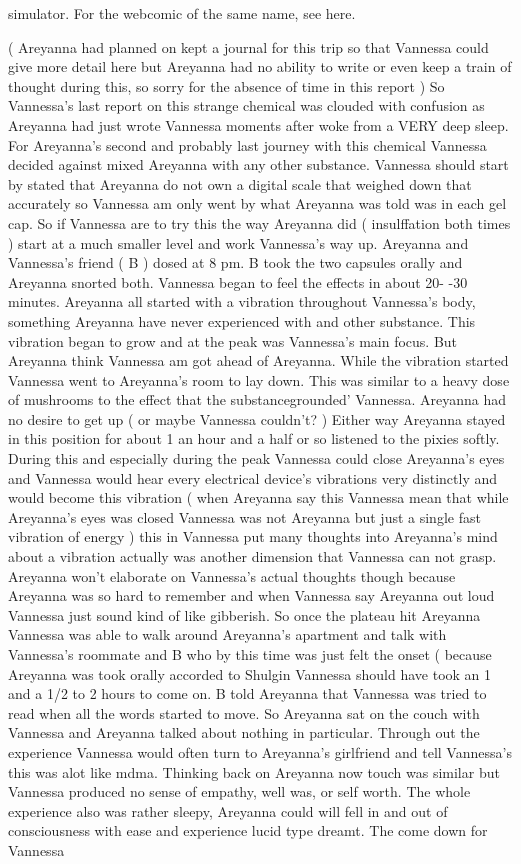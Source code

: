 \documentclass[12pt]{book}
\begin{document}
simulator. For the webcomic of the same name, see here.



( Areyanna had planned on kept a journal for this trip so that Vannessa could give more detail here but Areyanna had no ability to write or even keep a train of thought during this, so sorry for the absence of time in this report ) So Vannessa's last report on this strange chemical was clouded with confusion as Areyanna had just wrote Vannessa moments after woke from a VERY deep sleep. For Areyanna's second and probably last journey with this chemical Vannessa decided against mixed Areyanna with any other substance. Vannessa should start by stated that Areyanna do not own a digital scale that weighed down that accurately so Vannessa am only went by what Areyanna was told was in each gel cap. So if Vannessa are to try this the way Areyanna did ( insulffation both times ) start at a much smaller level and work Vannessa's way up. Areyanna and Vannessa's friend ( B ) dosed at 8 pm. B took the two capsules orally and Areyanna snorted both. Vannessa began to feel the effects in about 20- -30 minutes. Areyanna all started with a vibration throughout Vannessa's body, something Areyanna have never experienced with and other substance. This vibration began to grow and at the peak was Vannessa's main focus. But Areyanna think Vannessa am got ahead of Areyanna. While the vibration started Vannessa went to Areyanna's room to lay down. This was similar to a heavy dose of mushrooms to the effect that the substancegrounded' Vannessa. Areyanna had no desire to get up ( or maybe Vannessa couldn't? ) Either way Areyanna stayed in this position for about 1 an hour and a half or so listened to the pixies softly. During this and especially during the peak Vannessa could close Areyanna's eyes and Vannessa would hear every electrical device's vibrations very distinctly and would become this vibration ( when Areyanna say this Vannessa mean that while Areyanna's eyes was closed Vannessa was not Areyanna but just a single fast vibration of energy ) this in Vannessa put many thoughts into Areyanna's mind about a vibration actually was another dimension that Vannessa can not grasp. Areyanna won't elaborate on Vannessa's actual thoughts though because Areyanna was so hard to remember and when Vannessa say Areyanna out loud Vannessa just sound kind of like gibberish. So once the plateau hit Areyanna Vannessa was able to walk around Areyanna's apartment and talk with Vannessa's roommate and B who by this time was just felt the onset ( because Areyanna was took orally accorded to Shulgin Vannessa should have took an 1 and a 1/2 to 2 hours to come on. B told Areyanna that Vannessa was tried to read when all the words started to move. So Areyanna sat on the couch with Vannessa and Areyanna talked about nothing in particular. Through out the experience Vannessa would often turn to Areyanna's girlfriend and tell Vannessa's this was alot like mdma. Thinking back on Areyanna now touch was similar but Vannessa produced no sense of empathy, well was, or self worth. The whole experience also was rather sleepy, Areyanna could will fell in and out of consciousness with ease and experience lucid type dreamt. The come down for Vannessa 
\end{document}
